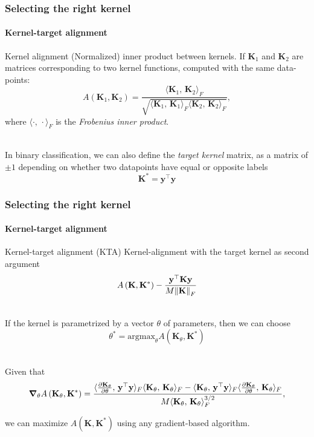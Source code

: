 \documentclass[aspectratio=43]{beamer}
\newcommand{\inner}[2]{\langle #1,\, #2\rangle}
\begin{document}
\begin{frame}
  \frametitle{Selecting the right kernel}
  \framesubtitle{Kernel-target alignment}

  \small
  \begin{exampleblock}{Kernel alignment}
    (Normalized) inner product between kernels. If $\mathbf{K}_1$ and $\mathbf{K}_2$ are matrices corresponding to two kernel functions, computed with the same data-points:
    \[A\left( \mathbf{K}_1, \mathbf{K}_2 \right) = \frac{\inner{\mathbf{K}_1}{\mathbf{K}_2}_F}{\sqrt{\inner{\mathbf{K}_1}{\mathbf{K}_1}_F \inner{\mathbf{K}_2}{\mathbf{K}_2}_F}},\]
    where $\inner{\cdot}{\cdot}_F$ is the \emph{Frobenius inner product}.
  \end{exampleblock}

  \ \\
  In binary classification, we can also define the \emph{target kernel} matrix, as a matrix of $\pm 1$ depending on whether two datapoints have equal or opposite labels
  \[\mathbf{K}^* = \mathbf{y}^\top \mathbf{y}\]

\end{frame}


\begin{frame}
  \frametitle{Selecting the right kernel}
  \framesubtitle{Kernel-target alignment}

  \small
  \begin{exampleblock}{Kernel-target alignment (KTA)}
    Kernel-alignment with the target kernel as second argument
    \[A\left( \mathbf{K}, \mathbf{K}^* \right) - \frac{\mathbf{y}^\top \mathbf{K} \mathbf{y}}{M \norm{\mathbf{K}}_F}\]
  \end{exampleblock}

  \ \\
  If the kernel is parametrized by a vector $\theta$ of parameters, then we can choose
  \[\theta^* = \mathrm{argmax}_\theta A\left( \mathbf{K}_\theta, \mathbf{K}^* \right)\]

  \ \\
  Given that
  \[\grad_\theta A\left( \mathbf{K}_\theta, \mathbf{K}^* \right) = \frac{\inner{\pdv{\mathbf{K}_\theta}{\theta}}{\mathbf{y}^\top \mathbf{y}}_F\inner{\mathbf{K}_\theta}{\mathbf{K}_\theta}_F - \inner{\mathbf{K}_\theta}{\mathbf{y}^\top \mathbf{y}}_F \inner{\pdv{\mathbf{K}_\theta}{\theta}}{\mathbf{K}_\theta}_F}{M\inner{\mathbf{K}_\theta}{\mathbf{K}_\theta}_F^{3/2}},\]

  we can maximize $A\left( \mathbf{K}, \mathbf{K}^* \right)$ using any gradient-based algorithm.
\end{frame}
\end{document}

